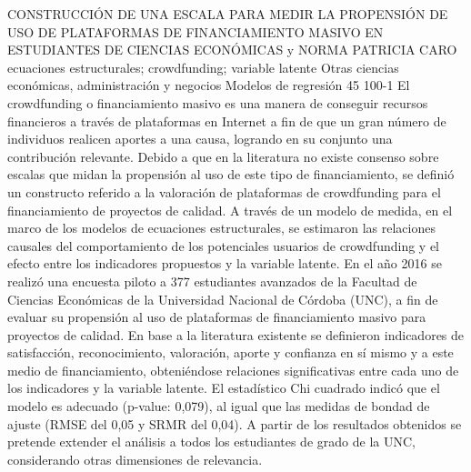 \A
{CONSTRUCCIÓN DE UNA ESCALA PARA MEDIR LA PROPENSIÓN DE USO DE PLATAFORMAS DE FINANCIAMIENTO MASIVO EN ESTUDIANTES DE CIENCIAS ECONÓMICAS}
{ y NORMA PATRICIA CARO}
{
\\}
{ecuaciones estructurales; crowdfunding; variable latente} 
 {Otras ciencias económicas, administración y negocios} 
 {Modelos de regresión} 
 {45} 
 {100-1}
{El crowdfunding o financiamiento masivo es una manera de conseguir recursos financieros a través de plataformas en Internet a fin de que un gran número de individuos realicen aportes a una causa, logrando en su conjunto una contribución relevante. Debido a que en la literatura no existe consenso sobre escalas que midan la propensión al uso de este tipo de financiamiento, se definió un constructo referido a la valoración de plataformas de crowdfunding para el financiamiento de proyectos de calidad. A través de un modelo de medida, en el marco de los modelos de ecuaciones estructurales, se estimaron las relaciones causales del comportamiento de los potenciales usuarios de crowdfunding y el efecto entre los indicadores propuestos y la variable latente. En el año 2016 se realizó una encuesta piloto a 377 estudiantes avanzados de la Facultad de Ciencias Económicas de la Universidad Nacional de Córdoba (UNC), a fin de evaluar su propensión al uso de plataformas de financiamiento masivo para proyectos de calidad. En base a la literatura existente se definieron indicadores de satisfacción, reconocimiento, valoración, aporte y confianza en sí mismo y a este medio de financiamiento, obteniéndose relaciones significativas entre cada uno de los indicadores y la variable latente. El estadístico Chi cuadrado indicó que el modelo es adecuado (p-value: 0,079), al igual que las medidas de bondad de ajuste (RMSE del 0,05 y SRMR del 0,04). A partir de los resultados obtenidos se pretende extender el análisis a todos los estudiantes de grado de la UNC, considerando otras dimensiones de relevancia.}
